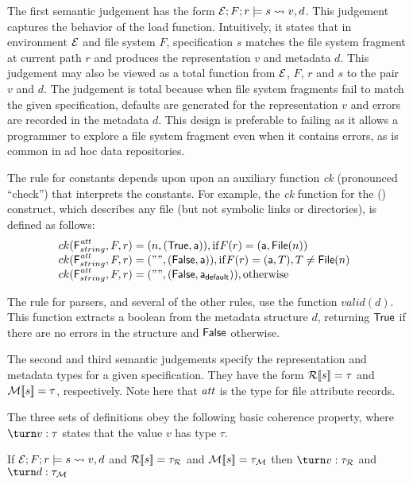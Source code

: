 The first semantic judgement has the form $\mathcal{E};F;r \models s \rightsquigarrow
v,d$.  This judgement captures the behavior of the load function.
Intuitively, it states that in environment $\mathcal{E}$ and file system $F$,
specification $s$ matches the file system fragment at current path $r$
and produces the representation $v$ and metadata $d$.  This judgement
may also be viewed as a total function from $\mathcal{E}$, $F$, $r$ and $s$
to the pair $v$ and $d$.  The judgement is total because when file
system fragments fail to match the given specification, defaults are
generated for the representation $v$ and errors are recorded in the
metadata $d$.  This design is preferable to failing as it allows a
programmer to explore a file system fragment even when it contains
errors, as is common in ad hoc data repositories.

The rule for constants depends upon upon an auxiliary function 
{\it ck} (pronounced ``check'') that interprets the constants.  For
example, the {\it ck} function for the (\pfile) construct, which
describes any file (but not symbolic links or directories), is defined
as follows:
\[
\begin{array}{@{}l}
ck(\mbox{\sf F}^{\metapdty}_{\stringty},F,r) = (n,(\True,\att)), \mathrm{if } F(r) = (\att,\File{n}) \\
ck(\mbox{\sf F}^{\metapdty}_{\stringty},F,r) = ("",(\False,\att)), \mathrm{if } F(r) = (\att,T), T \not=\File{n} \\
ck(\mbox{\sf F}^{\metapdty}_{\stringty},F,r) = ("",(\False,\defaultatt)), \mathrm{otherwise}
\end{array}
\]

The rule for \padshaskell{} parsers, and several of the other rules,
use the function $valid(d)$.  This function extracts a boolean from
the metadata structure $d$, returning $\mathsf{True}$ if there are no errors
in the structure and $\mathsf{False}$ otherwise. 

The second and third semantic judgements specify the representation
and metadata types for a given specification.  They have the form
${\cal R}[\![ s ]\!] = \tau$ and ${\cal M}[\![ s ]\!] = \tau$, respectively.  Note here
that $\mathit{att}$ is the type for file attribute records.

The three
sets of definitions obey the following basic coherence property, where
$\turn v : \tau$ states that the value $v$ has type $\tau$.

\begin{proposition}
  If $\mathcal{E};F;r \models s \rightsquigarrow v,d$ and ${\cal R}[\![ s ]\!] =
  \tau_{\mathcal{R}}$ and ${\cal M}[\![ s ]\!] = \tau_{\mathcal{M}}$ then $\turn
  v : \tau_{\mathcal{R}}$ and $\turn d : \tau_{\mathcal{M}}$
\end{proposition}

